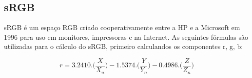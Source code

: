 





\subsection{sRGB}
\par
sRGB é um espaço RGB criado cooperativamente entre a HP e a Microsoft em 1996
para uso em monitores, impressoras e na Internet. As seguintes fórmulas são
utilizadas para o cálculo do sRGB, primeiro calculandos os componentes r, g, b:

\begin{equation}\label{eq:sRGB_r}
r=3.2410.\Big(\frac{X}{X_n}\Big)-1.5374.\Big(\frac{Y}{Y_n}
\Big)-0.4986.\Big(\frac{Z}{Z_n}\Big)
\end{equation}

